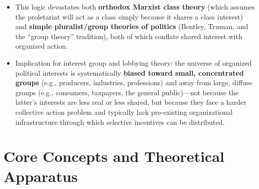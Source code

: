 \documentclass[12pt]{article}
\begin{document}
\begin{itemize}[leftmargin=*, itemsep=4pt]
    \item This logic devastates both \textbf{orthodox Marxist class theory} (which assumes the proletariat will act as a class simply because it shares a class interest) and \textbf{simple pluralist/group theories of politics} (Bentley, Truman, and the ``group theory'' tradition), both of which conflate shared interest with organized action.
    \item Implication for interest group and lobbying theory: the universe of organized political interests is systematically \textbf{biased toward small, concentrated groups} (e.g., producers, industries, professions) and away from large, diffuse groups (e.g., consumers, taxpayers, the general public)---not because the latter's interests are less real or less shared, but because they face a harder collective action problem and typically lack pre-existing organizational infrastructure through which selective incentives can be distributed.
\end{itemize}

\section{Core Concepts and Theoretical Apparatus}
\end{document}
